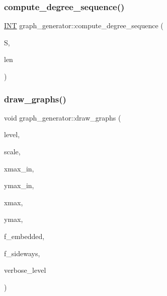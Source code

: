 \mbox{\label{classgraph__generator_aed762e0e135c3199f06859d5ffec9d6f}} 
\subsubsection{\texorpdfstring{compute\+\_\+degree\+\_\+sequence()}{compute\_degree\_sequence()}}
{\footnotesize\ttfamily \mbox{\hyperlink{galois_8h_a09fddde158a3a20bd2dcadb609de11dc}{I\+NT}} graph\+\_\+generator\+::compute\+\_\+degree\+\_\+sequence (\begin{DoxyParamCaption}\item[{\mbox{\hyperlink{galois_8h_a09fddde158a3a20bd2dcadb609de11dc}{I\+NT}} $\ast$}]{S,  }\item[{\mbox{\hyperlink{galois_8h_a09fddde158a3a20bd2dcadb609de11dc}{I\+NT}}}]{len }\end{DoxyParamCaption})}

\mbox{\label{classgraph__generator_aa07ad014571c0dbd09b93ccb99eb648e}} 
\subsubsection{\texorpdfstring{draw\+\_\+graphs()}{draw\_graphs()}}
{\footnotesize\ttfamily void graph\+\_\+generator\+::draw\+\_\+graphs (\begin{DoxyParamCaption}\item[{\mbox{\hyperlink{galois_8h_a09fddde158a3a20bd2dcadb609de11dc}{I\+NT}}}]{level,  }\item[{double}]{scale,  }\item[{\mbox{\hyperlink{galois_8h_a09fddde158a3a20bd2dcadb609de11dc}{I\+NT}}}]{xmax\+\_\+in,  }\item[{\mbox{\hyperlink{galois_8h_a09fddde158a3a20bd2dcadb609de11dc}{I\+NT}}}]{ymax\+\_\+in,  }\item[{\mbox{\hyperlink{galois_8h_a09fddde158a3a20bd2dcadb609de11dc}{I\+NT}}}]{xmax,  }\item[{\mbox{\hyperlink{galois_8h_a09fddde158a3a20bd2dcadb609de11dc}{I\+NT}}}]{ymax,  }\item[{\mbox{\hyperlink{galois_8h_a09fddde158a3a20bd2dcadb609de11dc}{I\+NT}}}]{f\+\_\+embedded,  }\item[{\mbox{\hyperlink{galois_8h_a09fddde158a3a20bd2dcadb609de11dc}{I\+NT}}}]{f\+\_\+sideways,  }\item[{\mbox{\hyperlink{galois_8h_a09fddde158a3a20bd2dcadb609de11dc}{I\+NT}}}]{verbose\+\_\+level }\end{DoxyParamCaption})}

